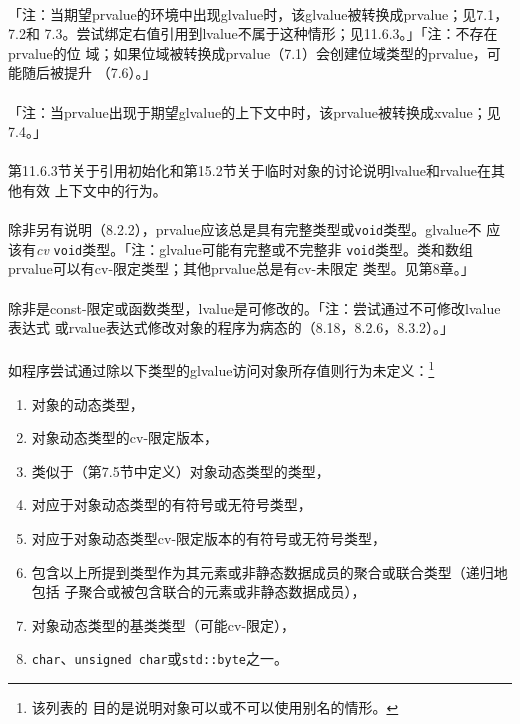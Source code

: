 \paragraph{}
「注：当期望prvalue的环境中出现glvalue时，该glvalue被转换成prvalue；见7.1，7.2和
7.3。尝试绑定右值引用到lvalue不属于这种情形；见11.6.3。」「注：不存在prvalue的位
域；如果位域被转换成prvalue（7.1）会创建位域类型的prvalue，可能随后被提升
（7.6）。」

\paragraph{}
「注：当prvalue出现于期望glvalue的上下文中时，该prvalue被转换成xvalue；见7.4。」

\paragraph{}
第11.6.3节关于引用初始化和第15.2节关于临时对象的讨论说明lvalue和rvalue在其他有效
上下文中的行为。

\paragraph{}
除非另有说明（8.2.2），prvalue应该总是具有完整类型或\texttt{void}类型。glvalue不
应该有\textit{cv} \texttt{void}类型。「注：glvalue可能有完整或不完整非
\texttt{void}类型。类和数组prvalue可以有cv-限定类型；其他prvalue总是有cv-未限定
类型。见第8章。」

\paragraph{}
除非是const-限定或函数类型，lvalue是可修改的。「注：尝试通过不可修改lvalue表达式
或rvalue表达式修改对象的程序为病态的（8.18，8.2.6，8.3.2）。」

\paragraph{}
如程序尝试通过除以下类型的glvalue访问对象所存值则行为未定义：\footnote{该列表的
目的是说明对象可以或不可以使用别名的情形。}
\begin{enumerate}
  \item{对象的动态类型，}
  \item{对象动态类型的cv-限定版本，}
  \item{类似于（第7.5节中定义）对象动态类型的类型，}
  \item{对应于对象动态类型的有符号或无符号类型，}
  \item{对应于对象动态类型cv-限定版本的有符号或无符号类型，}
  \item{包含以上所提到类型作为其元素或非静态数据成员的聚合或联合类型（递归地包括
    子聚合或被包含联合的元素或非静态数据成员），}
  \item{对象动态类型的基类类型（可能cv-限定），}
  \item{\texttt{char}、\texttt{unsigned char}或\texttt{std::byte}之一。}
\end{enumerate}

